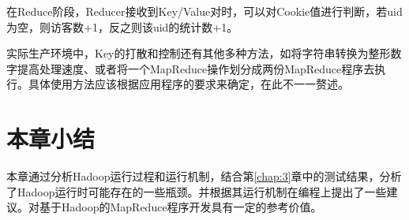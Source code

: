 在Reduce阶段，Reducer接收到Key/Value对时，可以对Cookie值进行判断，若uid为空，则访客数+1，反之则该uid的统计数+1。

实际生产环境中，Key的打散和控制还有其他多种方法，如将字符串转换为整形数字提高处理速度、或者将一个MapReduce操作划分成两份MapReduce程序去执行。具体使用方法应该根据应用程序的要求来确定，在此不一一赘述。

\section{本章小结}
本章通过分析Hadoop运行过程和运行机制，结合第\ref{chap:3}章中的测试结果，分析了Hadoop运行时可能存在的一些瓶颈。并根据其运行机制在编程上提出了一些建议。对基于Hadoop的MapReduce程序开发具有一定的参考价值。